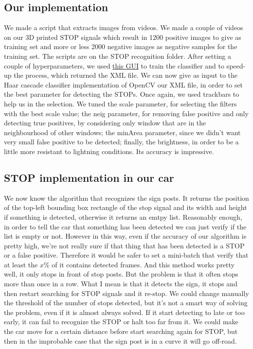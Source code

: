 \documentclass[12pt,a4paper]{article}
\begin{document}
\begin{large}
\subsection{Our implementation}
We made a script that extracts images from videos. We made a couple of videos on our 3D printed STOP signals which result in 1200 positive images to give as training set and more or less 2000 negative images as negative samples for the training set. The scripts are on the STOP recognition folder. After setting a couple of hyperparameters, we used \href{https://amin-ahmadi.com/cascade-trainer-gui/}{this GUI} to train the classifier and to speed-up the process, which returned the XML file.
We can now give as input to the Haar cascade classifier implementation of OpenCV our XML file, in order to set the best parameter for detecting the STOPs. Once again, we used trackbars to help us in the selection. We tuned the scale parameter, for selecting the filters with the best scale value; the neig parameter, for removing false positive and only detecting true positives, by considering only window that are in the neighbourhood of other windows; the minArea parameter, since we didn't want very small false positive to be detected; finally, the brightness, in order to be a little more resistant to lightning conditions. Its accuracy is impressive.



\subsection{STOP implementation in our car}
We now know the algorithm that recognizes the sign posts. It returns the position of the top-left bounding box rectangle of the stop signal and its width and height if something is detected, otherwise it returns an emtpy list. Reasonably enough, in order to tell the car that something has been detected we can just verify if the list is empty or not. However in this way, even if the accuracy of our algorithm is pretty high, we're not really sure if that thing that has been detected is a STOP or a false positive. Therefore it would be safer to set a mini-batch that verify that at least the $x$\% of it contains detected frames. And this method works pretty well, it only stops in front of stop posts. But the problem is that it often stops more than once in a row. What I mean is that it detects the sign, it stops and then restart searching for STOP signals and it re-stop. We could change manually the threshold of the number of stops detected, but it's not a smart way of solving the problem, even if it is almost always solved. If it start detecting to late or too early, it can fail to recognize the STOP or halt too far from it. We could make the car move for a certain distance before start searching again for STOP, but then in the improbable case that the sign post is in a curve it will go off-road.

\end{large}
\end{document}
